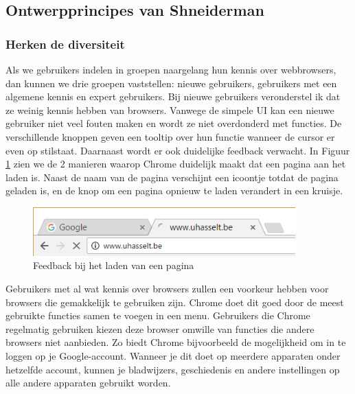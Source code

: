 \documentclass[12pt]{article}
\begin{document}
\subsection{Ontwerpprincipes van Shneiderman}
\subsubsection{Herken de diversiteit}
Als we gebruikers indelen in groepen naargelang hun kennis over webbrowsers, dan kunnen we drie groepen vaststellen: nieuwe gebruikers, gebruikers met een algemene kennis en expert gebruikers. Bij nieuwe gebruikers veronderstel ik dat ze weinig kennis hebben van browsers. Vanwege de simpele UI kan een nieuwe gebruiker niet veel fouten maken en wordt ze niet overdonderd met functies. De verschillende knoppen geven een tooltip over hun functie wanneer de cursor er even op stilstaat. Daarnaast wordt er ook duidelijke feedback verwacht. In Figuur \ref{fig:paginaLaden} zien we de 2 manieren waarop Chrome duidelijk maakt dat een pagina aan het laden is. Naast de naam van de pagina verschijnt een icoontje totdat de pagina geladen is, en de knop om een pagina opnieuw te laden verandert in een kruisje.
\begin{figure}
	\centering
	\includegraphics[width=0.9\textwidth]{imgPaginaLaden.png}
	\caption{Feedback bij het laden van een pagina}
	\label{fig:paginaLaden}
\end{figure}
\linebreak
Gebruikers met al wat kennis over browsers zullen een voorkeur hebben voor browsers die gemakkelijk te gebruiken zijn. Chrome doet dit goed door de meest gebruikte functies samen te voegen in een menu. 
\linebreak
Gebruikers die Chrome regelmatig gebruiken kiezen deze browser omwille van functies die andere browsers niet aanbieden. Zo biedt Chrome bijvoorbeeld de mogelijkheid om in te loggen op je Google-account. Wanneer je dit doet op meerdere apparaten onder hetzelfde account, kunnen je bladwijzers, geschiedenis en andere instellingen op alle andere apparaten gebruikt worden.
\end{document}

